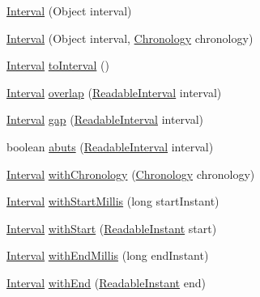 \begin{DoxyCompactItemize}
\hyperlink{classorg_1_1joda_1_1time_1_1_interval_a1417fe355e3046c9313a106787d6ddeb}{Interval} (Object interval)
\item 
\hyperlink{classorg_1_1joda_1_1time_1_1_interval_acb9b99a58cc62639385f603da1d05bc2}{Interval} (Object interval, \hyperlink{classorg_1_1joda_1_1time_1_1_chronology}{Chronology} chronology)
\item 
\hyperlink{classorg_1_1joda_1_1time_1_1_interval}{Interval} \hyperlink{classorg_1_1joda_1_1time_1_1_interval_a2b428b74ccdc0d4a070443d13e58229d}{to\-Interval} ()
\item 
\hyperlink{classorg_1_1joda_1_1time_1_1_interval}{Interval} \hyperlink{classorg_1_1joda_1_1time_1_1_interval_a71e6e25748db44ae362cf1abe0b1e42a}{overlap} (\hyperlink{interfaceorg_1_1joda_1_1time_1_1_readable_interval}{Readable\-Interval} interval)
\item 
\hyperlink{classorg_1_1joda_1_1time_1_1_interval}{Interval} \hyperlink{classorg_1_1joda_1_1time_1_1_interval_a8f5bda6c2beda5f60121bb0e4bba4a5e}{gap} (\hyperlink{interfaceorg_1_1joda_1_1time_1_1_readable_interval}{Readable\-Interval} interval)
\item 
boolean \hyperlink{classorg_1_1joda_1_1time_1_1_interval_aad7ede8f9d365b95d0b51f5565f806bd}{abuts} (\hyperlink{interfaceorg_1_1joda_1_1time_1_1_readable_interval}{Readable\-Interval} interval)
\item 
\hyperlink{classorg_1_1joda_1_1time_1_1_interval}{Interval} \hyperlink{classorg_1_1joda_1_1time_1_1_interval_abcb484d9a0b5f9f02e251c9301ecaa8f}{with\-Chronology} (\hyperlink{classorg_1_1joda_1_1time_1_1_chronology}{Chronology} chronology)
\item 
\hyperlink{classorg_1_1joda_1_1time_1_1_interval}{Interval} \hyperlink{classorg_1_1joda_1_1time_1_1_interval_ad433bdca30b4bdda619abe125848ba71}{with\-Start\-Millis} (long start\-Instant)
\item 
\hyperlink{classorg_1_1joda_1_1time_1_1_interval}{Interval} \hyperlink{classorg_1_1joda_1_1time_1_1_interval_a80fff8920254972c018e43c460ce4ecc}{with\-Start} (\hyperlink{interfaceorg_1_1joda_1_1time_1_1_readable_instant}{Readable\-Instant} start)
\item 
\hyperlink{classorg_1_1joda_1_1time_1_1_interval}{Interval} \hyperlink{classorg_1_1joda_1_1time_1_1_interval_a7b31f9fc2583cddb39758e4c7954de20}{with\-End\-Millis} (long end\-Instant)
\item 
\hyperlink{classorg_1_1joda_1_1time_1_1_interval}{Interval} \hyperlink{classorg_1_1joda_1_1time_1_1_interval_a314c0b168914b2a264e17f5e166edb61}{with\-End} (\hyperlink{interfaceorg_1_1joda_1_1time_1_1_readable_instant}{Readable\-Instant} end)

\end{DoxyCompactItemize}
